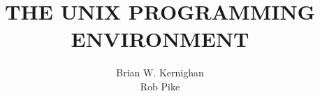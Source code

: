 \documentclass[12pt]{book}
\begin{document}
\renewcommand{\thefigure}{\thechapter-\arabic{figure}}

\frontmatter
\title{
  \Huge{THE UNIX PROGRAMMING ENVIRONMENT} \\[1ex]
}
\author{
  Brian W. Kernighan \\
  Rob Pike
}
\date{}
\maketitle
\tableofcontents



\mainmatter











\appendix




\backmatter
\end{document}
